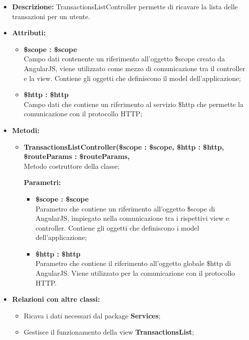 \begin{itemize}
	\item \textbf{Descrizione:} TransactionsListController permette di ricavare la lista delle transazioni per un utente.
	\item \textbf{Attributi:}
	\begin{itemize}
		
		\item \textbf{\$scope : \$scope}\\
		Campo dati contenente un riferimento all'oggetto \$scope creato da AngularJS, viene utilizzato come mezzo di comunicazione tra il controller e la view. Contiene gli oggetti che definiscono il model dell'applicazione;
		
		\item \textbf{\$http : \$http }\\
		Campo dati che contiene un riferimento al servizio \$http che permette la comunicazione con il protocollo HTTP;
		
	\end{itemize}
	\item \textbf{Metodi:}
	\begin{itemize}
		
		\item \textbf{TransactionsListController(\$scope : \$scope, \$http : \$http, \$routeParams : \$routeParams,}\\
		Metodo costruttore della classe;
		\begin{description}
			\item[\textbf{Parametri:}]
		\end{description}
		\begin{itemize}
			\item \textbf{\$scope : \$scope}\\
			Parametro che contiene un riferimento all'oggetto \$scope di AngularJS, impiegato nella comunicazione tra i rispettivi view e controller. Contiene gli oggetti che definiscono i model dell'applicazione;
			
			\item \textbf{\$http : \$http}\\
			Parametro che contiene il riferimento all'oggetto globale \$http di AngularJS. Viene utilizzato per la comunicazione con il protocollo HTTP.
			
		\end{itemize}
		
	\end{itemize}
	\item \textbf{Relazioni con altre classi:}
	\begin{itemize}
		\item Ricava i dati necessari dal package \textbf{Services};
		\item Gestisce il funzionamento della view \textbf{TransactionsList};
	\end{itemize}
\end{itemize}

